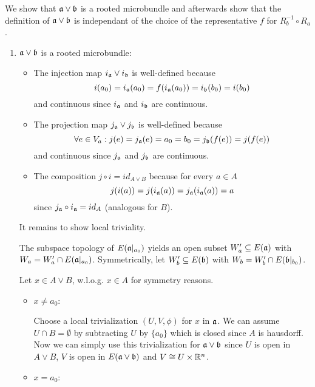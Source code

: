 \begin{myproof}
    We show that $\mathfrak{a} \vee \mathfrak{b}$ is a rooted microbundle and afterwards show
    that the definition of $\mathfrak{a} \vee \mathfrak{b}$ is independant of the choice of the representative $f$ for $R_b^{-1} \circ R_a$.
    \begin{enumerate}
        \item $\mathfrak{a} \vee \mathfrak{b}$ is a rooted microbundle:
        \begin{itemize}
            \item The injection map $i_{\mathfrak{a}} \vee i_{\mathfrak{b}}$ is well-defined because 
            \[ i(a_0) = i_{\mathfrak{a}}(a_0) = f(i_{\mathfrak{a}}(a_0)) = i_{\mathfrak{b}}(b_0) = i(b_0) \]
            and continuous since $i_{\mathfrak{a}}$ and $i_{\mathfrak{b}}$ are continuous.
            \item The projection map $j_{\mathfrak{a}} \vee j_{\mathfrak{b}}$ is well-defined because
            \[ \forall e \in V_a: j(e) = j_{\mathfrak{a}}(e) = a_0 = b_0 = j_{\mathfrak{b}}(f(e)) = j(f(e)) \]
            and continuous since $j_{\mathfrak{a}}$ and $j_{\mathfrak{b}}$ are continuous.
            \item The composition $j \circ i = id_{A \vee B}$ because for every $a \in A$
            \[ j(i(a)) = j(i_{\mathfrak{a}}(a)) = j_{\mathfrak{a}}(i_{\mathfrak{a}}(a)) = a \]
            since $j_{\mathfrak{a}} \circ i_{\mathfrak{a}} = id_A$ (analogous for $B$).
        \end{itemize}
        It remains to show local triviality.

        The subspace topology of $E(\mathfrak{a}\vert_{a_0})$ yields an open subset $W_a' \subseteq{} E(\mathfrak{a})$ with $W_a = W_a' \cap E(\mathfrak{a}\vert_{a_0})$.
        Symmetrically, let $W_b' \subseteq{} E(\mathfrak{b})$ with $W_b = W_b' \cap E(\mathfrak{b}\vert_{b_0})$.

        Let $x \in A \vee B$, w.l.o.g. $x \in A$ for symmetry reasons.
        \begin{itemize}
            \item $x \neq a_0$:
            
            Choose a local trivialization $(U, V, \phi)$ for $x$ in $\mathfrak{a}$.
            We can assume $U \cap B = \emptyset$ by subtracting $U$ by $\{a_0\}$ which is closed since $A$ is hausdorff.
            Now we can simply use this trivialization for $\mathfrak{a} \vee \mathfrak{b}$ since $U$ is open in $A \vee B$, $V$ is open in $E(\mathfrak{a} \vee \mathfrak{b})$ and $V \cong U \times \mathbb{R}^n$.
            \item $x = a_0$:
            

\end{itemize}
\end{enumerate}
\end{myproof}
